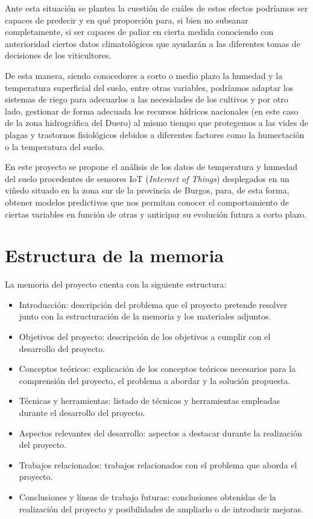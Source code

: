 Ante esta situación se plantea la cuestión de cuáles de estos efectos podríamos ser capaces de predecir
y en qué proporción para, si bien no subsanar completamente, si ser capaces de paliar en cierta medida
conociendo con anterioridad ciertos datos climatológicos que ayudarán a las diferentes tomas de decisiones de 
los viticultores.

De esta manera, siendo conocedores a corto o medio plazo la humedad y la temperatura superficial del suelo,
entre otras variables, podríamos adaptar los sistemas de riego para adecuarlos a las necesidades de los
cultivos y por otro lado, gestionar de forma adecuada los recursos hídricos nacionales (en este caso
de la zona hidrográfica del Duero) al mismo tiempo que protegemos a las vides de plagas y trastornos fisiológicos 
debidos a diferentes factores como la humectación o la temperatura del suelo.

En este proyecto se propone el análisis de los datos de temperatura y humedad del suelo procedentes de 
sensores IoT (\textit{Internet of Things}) desplegados en un viñedo situado en la zona sur de la provincia de Burgos, para, de esta forma,
obtener modelos predictivos que nos permitan conocer el comportamiento de ciertas variables en función de otras
y anticipar su evolución futura a corto plazo.

\section{Estructura de la memoria}
La memoria del proyecto cuenta con la siguiente estructura:
\begin{itemize}
    \item Introducción: descripción del problema que el proyecto pretende resolver junto con la estructuración 
        de la memoria y los materiales adjuntos.
    \item Objetivos del proyecto: descripción de los objetivos a cumplir con el desarrollo del proyecto.
    \item Conceptos teóricos: explicación de los conceptos teóricos necesarios para la comprensión del proyecto, 
        el problema a abordar y la solución propuesta.
    \item Técnicas y herramientas: listado de técnicas y herramientas empleadas durante el desarrollo del proyecto.
    \item Aspectos relevantes del desarrollo: aspectos a destacar durante la realización del proyecto.
    \item Trabajos relacionados: trabajos relacionados con el problema que aborda el proyecto.
    \item Conclusiones y líneas de trabajo futuras: conclusiones obtenidas de la realización del proyecto y posibilidades
        de ampliarlo o de introducir mejoras.
\end{itemize}

